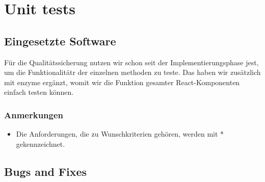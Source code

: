 \section{Unit tests}

\subsection{Eingesetzte Software}

Für die Qualitätssicherung nutzen wir schon seit der Implementierungsphase jest, um die Funktionalitätr der einzelnen methoden zu teste. Das haben wir zusätzlich mit enzyme ergänzt, womit wir die Funktion gesamter React-Komponenten einfach testen können.

\subsubsection{Anmerkungen}
\begin{itemize}
  \item Die Anforderungen, die zu Wunschkriterien gehören, werden mit * gekennzeichnet.
\end{itemize}

\subsection{Bugs and Fixes}




